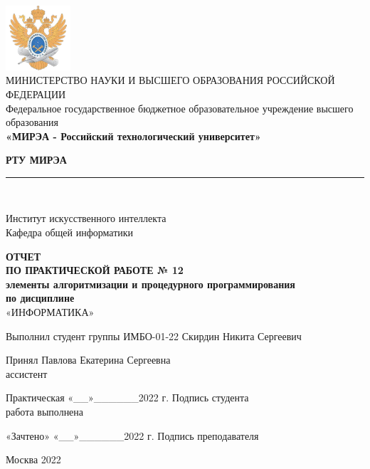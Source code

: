 \documentclass[14pt, a4paper]{extreport}
\newcommand{\doublerule}[1][.4pt]{%
	\noindent
	\makebox[0pt][l]{\rule[.6ex]{\linewidth}{#1}}%
	\rule[.3ex]{\linewidth}{#1}
}
\begin{document}

\begin{titlepage}
	\begin{center}
		\vspace*{0.5mm}

		\includegraphics[width=0.18\textwidth]{logo}\\
		\footnotesize
		МИНИСТЕРСТВО НАУКИ И ВЫСШЕГО ОБРАЗОВАНИЯ РОССИЙСКОЙ ФЕДЕРАЦИИ\\
		\small
		Федеральное государственное бюджетное образовательное учреждение высшего образования\\
		\textbf{«МИРЭА - Российский технологический университет»}
		\vspace{0.5cm}

		\large \textbf{РТУ МИРЭА} \normalsize

		\doublerule[1pt]\\
		\vspace{0.4cm}

		Институт искусственного интеллекта\\
		Кафедра общей информатики
		\vspace{1.5cm}

		\textbf{ОТЧЕТ}\\
		\textbf{ПО ПРАКТИЧЕСКОЙ РАБОТЕ № 12}\\
		\textbf{элементы алгоритмизации и процедурного программирования}\\
		\textbf{по дисциплине}\\
		«ИНФОРМАТИКА»
		\vspace{1.5cm}

		\small
		Выполнил студент группы ИМБО-01-22 \hfill Скирдин Никита Сергеевич
		\vspace{1cm}

		Принял \hfill Павлова Екатерина Сергеевна\\
		ассистент \hfill
		\vspace{1.5cm}

		\footnotesize
		\hspace{0.5cm} Практическая \hfill «\_\_»\_\_\_\_\_\_2022 г. \hfill Подпись студента\\
		\hspace{0.5cm} работа выполнена \hfill
		\vspace{0.5cm}

		\hspace{2cm} «Зачтено» \hfill «\_\_»\_\_\_\_\_\_2022 г. \hfill Подпись преподавателя
		\vfill

		\small
		Москва 2022
	\end{center}
	\thispagestyle{empty}
\end{titlepage}
\end{document}
